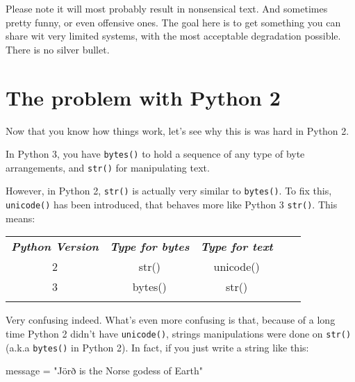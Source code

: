 Please note it will most probably result in nonsensical text. And sometimes pretty funny, or even offensive ones. The goal here is to get something you can share wit very limited systems, with the most acceptable degradation possible. There is no silver bullet.

\section{The problem with Python 2}

Now that you know how things work, let's see why this is was hard in Python 2.

In Python 3, you have \lstinline{bytes()} to hold a sequence of any type of byte arrangements, and \lstinline{str()} for manipulating text.

However, in Python 2, \lstinline{str()} is actually very similar to \lstinline{bytes()}. To fix this, \lstinline{unicode()} has been introduced, that behaves more like Python 3 \lstinline{str()}. This means:

\begin{table}[h]
\begin{tabular}{cccll}
\cline{1-3}
\multicolumn{1}{|c|}{\textit{\textbf{Python Version}}} & \multicolumn{1}{c|}{\textit{\textbf{Type for bytes}}} & \multicolumn{1}{c|}{\textit{\textbf{Type for text}}} &  &  \\ \cline{1-3}
\multicolumn{1}{|c|}{2}                                & \multicolumn{1}{c|}{str()}                            & \multicolumn{1}{c|}{unicode()}                       &  &  \\ \cline{1-3}
\multicolumn{1}{|c|}{3}                                & \multicolumn{1}{c|}{bytes()}                          & \multicolumn{1}{c|}{str()}                           &  &  \\ \cline{1-3}
\multicolumn{1}{l}{}                                   & \multicolumn{1}{l}{}                                  & \multicolumn{1}{l}{}                                 &  &
\end{tabular}
\end{table}

Very confusing indeed. What's even more confusing is that, because of a long time Python 2 didn't have \lstinline{unicode()}, strings manipulations were done on \lstinline{str()} (a.k.a \lstinline{bytes()} in Python 2). In fact, if you just write a string like this:

\begin{py2}
message = "Jörð is the Norse godess of Earth"
\end{py2}

